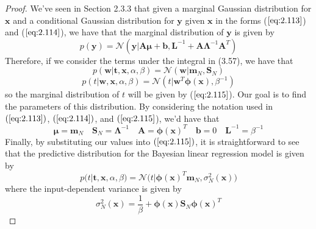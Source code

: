 \begin{proof}
    We've seen in Section 2.3.3 that given a marginal Gaussian distribution
    for $\mathbf{x}$ and a conditional Gaussian distribution for $\mathbf{y}$
    given $\mathbf{x}$ in the forms ($\ref{eq:2.113}$) and ($\ref{eq:2.114}$),
    we have that the marginal distribution of $\mathbf{y}$ is given by
    \begin{equation}\label{eq:2.115}\tag{2.115}
        p(\mathbf{y}) 
        = \mathcal{N}(\mathbf{y} | \mathbf{A}\bm{\mu} + \mathbf{b}, \mathbf{L}^{-1}
            + \mathbf{A\Lambda}^{-1} \mathbf{A}^T) 
    \end{equation}
    Therefore, if we consider the terms under the integral in (3.57),
    we have that
    \[
        p(\mathbf{w} | \mathbf{t}, \mathbf{x}, \alpha, \beta) 
        = \mathcal{N}(\mathbf{w} | \mathbf{m}_N, \mathbf{S}_N)
    \] 
    \[
        p(t | \mathbf{w}, \mathbf{x}, \alpha, \beta) 
        = \mathcal{N}(t | \mathbf{w}^T\bm{\phi}(\mathbf{x}), \beta^{-1}) 
    \] 
    so the marginal distribution of $t$ will be given by ($\ref{eq:2.115}$).
    Our goal is to find the parameters of this distribution. By considering
    the notation used in $(\ref{eq:2.113})$, $(\ref{eq:2.114})$, and $(\ref{eq:2.115}$),
    we'd have that
    \[
        \bm{\mu} = \mathbf{m}_N 
        \hspace{1em}
        \mathbf{S}_N = \mathbf{\Lambda}^{-1}
        \hspace{1em}
        \mathbf{A} = \bm{\phi}(\mathbf{x})^T
        \hspace{1em}
        \mathbf{b} = 0
        \hspace{1em}
        \mathbf{L}^{-1} = \beta^{-1}
    \] 
    Finally, by substituting our values into $(\ref{eq:2.115})$, it is 
    straightforward to see that the predictive distribution for the Bayesian 
    linear regression model is given by
    \begin{equation}\label{eq:3.58}\tag{3.58}
        p(t | \mathbf{t}, \mathbf{x}, \alpha, \beta) 
        = \mathcal{N}\big(t | \bm{\phi}(\mathbf{x})^T\mathbf{m}_N, \sigma^2_N(\mathbf{x})\big)
    \end{equation}
    where the input-dependent variance is given by
    \begin{equation}\label{eq:3.59}\tag{3.59}
        \sigma_{N}^2(\mathbf{x})
        = \frac{1}{\beta} + \bm{\phi}(\mathbf{x})\mathbf{S}_N\bm{\phi}(\mathbf{x})^T
    \end{equation}
\end{proof}

